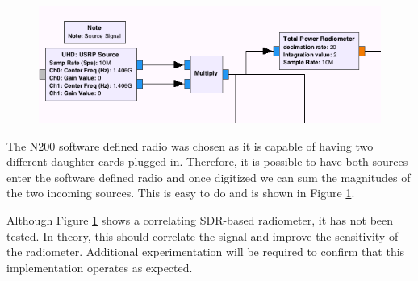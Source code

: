 {\begin{figure}[h!tb] 
\centering
\includegraphics[width=14cm]{Images/N200_rad_corr.png}
\label{correlating_sdr}
\end{figure}
}

The N200 software defined radio was chosen as it is capable of having two different daughter-cards plugged in.  Therefore, it is possible to have both sources enter the software defined radio and once digitized we can sum the magnitudes of the two incoming sources.  This is easy to do and is shown in Figure \ref{correlating_sdr}.

Although Figure \ref{correlating_sdr} shows a correlating SDR-based radiometer, it has not been tested.  In theory, this should correlate the signal and improve the sensitivity of the radiometer.  Additional experimentation will be required to confirm that this implementation operates as expected.



